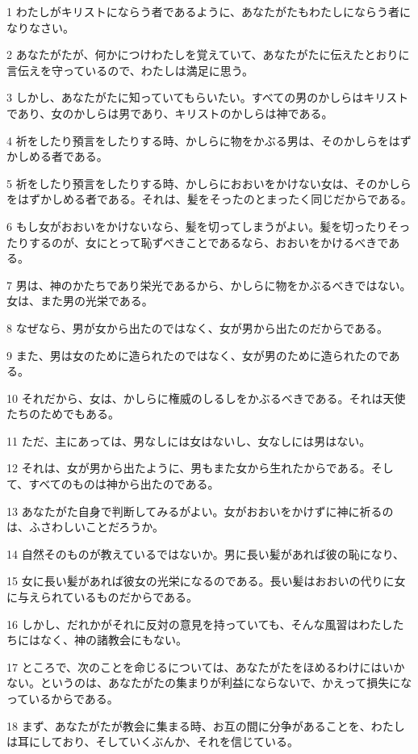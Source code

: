 \par 1 わたしがキリストにならう者であるように、あなたがたもわたしにならう者になりなさい。
\par 2 あなたがたが、何かにつけわたしを覚えていて、あなたがたに伝えたとおりに言伝えを守っているので、わたしは満足に思う。
\par 3 しかし、あなたがたに知っていてもらいたい。すべての男のかしらはキリストであり、女のかしらは男であり、キリストのかしらは神である。
\par 4 祈をしたり預言をしたりする時、かしらに物をかぶる男は、そのかしらをはずかしめる者である。
\par 5 祈をしたり預言をしたりする時、かしらにおおいをかけない女は、そのかしらをはずかしめる者である。それは、髪をそったのとまったく同じだからである。
\par 6 もし女がおおいをかけないなら、髪を切ってしまうがよい。髪を切ったりそったりするのが、女にとって恥ずべきことであるなら、おおいをかけるべきである。
\par 7 男は、神のかたちであり栄光であるから、かしらに物をかぶるべきではない。女は、また男の光栄である。
\par 8 なぜなら、男が女から出たのではなく、女が男から出たのだからである。
\par 9 また、男は女のために造られたのではなく、女が男のために造られたのである。
\par 10 それだから、女は、かしらに権威のしるしをかぶるべきである。それは天使たちのためでもある。
\par 11 ただ、主にあっては、男なしには女はないし、女なしには男はない。
\par 12 それは、女が男から出たように、男もまた女から生れたからである。そして、すべてのものは神から出たのである。
\par 13 あなたがた自身で判断してみるがよい。女がおおいをかけずに神に祈るのは、ふさわしいことだろうか。
\par 14 自然そのものが教えているではないか。男に長い髪があれば彼の恥になり、
\par 15 女に長い髪があれば彼女の光栄になるのである。長い髪はおおいの代りに女に与えられているものだからである。
\par 16 しかし、だれかがそれに反対の意見を持っていても、そんな風習はわたしたちにはなく、神の諸教会にもない。
\par 17 ところで、次のことを命じるについては、あなたがたをほめるわけにはいかない。というのは、あなたがたの集まりが利益にならないで、かえって損失になっているからである。
\par 18 まず、あなたがたが教会に集まる時、お互の間に分争があることを、わたしは耳にしており、そしていくぶんか、それを信じている。
